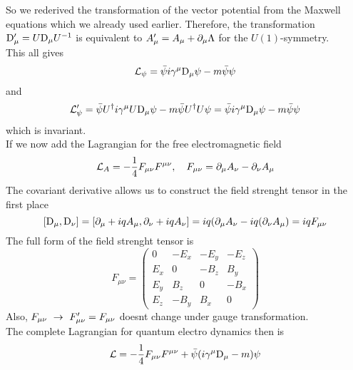 So we rederived the transformation of the vector potential from the Maxwell equations which we already used earlier. Therefore, the transformation ${\rm D}'_\mu = U {\rm D}_\mu U^{-1}$ is equivalent to $A'_\mu = A_\mu + \partial_\mu \Lambda$ for the $U(1)$-symmetry.\\
This all gives
\[ \mathcal{L}_\psi = \bar{\psi} i \gamma^\mu {\rm D}_\mu \psi - m \bar{\psi}\psi\]
and
\[ \mathcal{L}'_\psi = \bar{\psi} U^\dagger i \gamma^\mu U {\rm D}_\mu \psi - m \bar{\psi}U^\dagger U \psi = \bar{\psi}i \gamma^\mu {\rm D}_\mu \psi - m \bar{\psi}\psi\]
which is invariant.\\
If we now add the Lagrangian for the free electromagnetic field
\[ \mathcal{L}_A = - \frac{1}{4} F_{\mu \nu} F^{\mu \nu}, ~~~ F_{\mu \nu} = \partial_\mu A_\nu - \partial_\nu A_\mu\]
The covariant derivative allows us to construct the field strenght tensor in the first place
\[ [{\rm D}_\mu, {\rm D}_\nu] = [ \partial_\mu + i q A_\mu, \partial_\nu + i q A_\nu] = i q ( \partial_\mu A_\nu - iq ( \partial_\nu A_\mu) = iq F_{\mu\nu}\]
The full form of the field strenght tensor is
\[ F_{\mu\nu} = \begin{pmatrix} 0 & -E_x & - E_y & -E_z \\
E_x & 0 & - B_z & B_y \\
E_y & B_z & 0 & - B_x \\
E_z & -B_y & B_x & 0 \end{pmatrix}\]
Also, $F_{\mu\nu} ~\rightarrow~F'_{\mu\nu} = F_{\mu\nu}$ doesnt change under gauge transformation.\\
The complete Lagrangian for quantum electro dynamics then is
\[\mathcal{L} = -\frac{1}{4} F_{\mu\nu}F^{\mu\nu} + \bar{\psi} ( i \gamma^\mu {\rm D}_\mu - m )\psi\]
